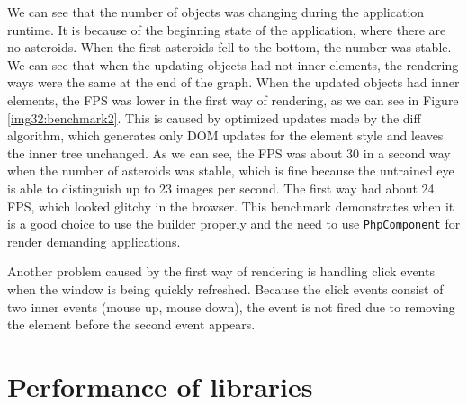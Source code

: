 \par
We can see that the number of objects was changing during the application runtime.
It is because of the beginning state of the application, where there are no asteroids.
When the first asteroids fell to the bottom, the number was stable.
We can see that when the updating objects had not inner elements, the rendering ways were the same at the end of the graph.
When the updated objects had inner elements, the FPS was lower in the first way of rendering, as we can see in Figure \ref{img32:benchmark2}.
This is caused by optimized updates made by the diff algorithm, which generates only DOM updates for the element style and leaves the inner tree unchanged.
As we can see, the FPS was about 30 in a second way when the number of asteroids was stable, which is fine because the untrained eye is able to distinguish up to 23 images per second.
The first way had about 24 FPS, which looked glitchy in the browser.
This benchmark demonstrates when it is a good choice to use the builder properly and the need to use \texttt{PhpComponent} for render demanding applications.
\par
Another problem caused by the first way of rendering is handling click events when the window is being quickly refreshed.
Because the click events consist of two inner events (mouse up, mouse down), the event is not fired due to removing the element before the second event appears.

\section{Performance of libraries}

